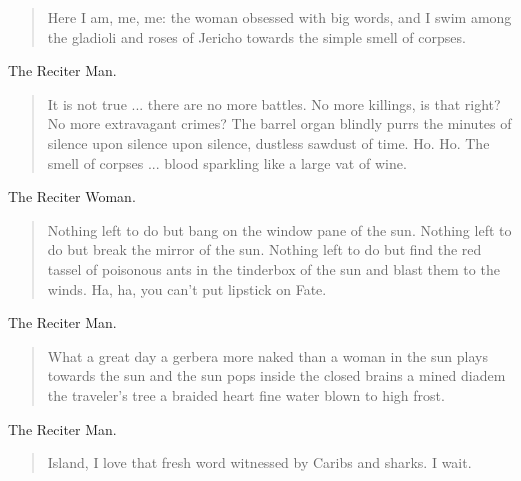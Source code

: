 \documentclass[letterpaper,article,12pt,oneside,notitlepage]{memoir}
\begin{document}
\begin{verse}
Here I am, me, me: the woman obsessed with big words, and I swim among the gladioli and roses of Jericho towards the simple smell of corpses. \\
\end{verse}

\begin{center}The Reciter Man.\end{center}

\begin{verse}
It is not true ... there are no more battles. No more killings, is that right? No more extravagant crimes? The barrel organ blindly purrs the minutes of silence upon silence upon silence, dustless sawdust of time. Ho. Ho. The smell of corpses ... blood sparkling like a large vat of wine. \\
\end{verse}

\begin{center}The Reciter Woman.\end{center}

\begin{verse}
Nothing left to do but bang on the window pane of the sun. Nothing left to do but break the mirror of the sun. Nothing left to do but find the red tassel of poisonous ants in the tinderbox of the sun and blast them to the winds. Ha, ha, you can't put lipstick on Fate. \\
\end{verse}

\clearpage

\begin{center}The Reciter Man.\end{center}

\begin{verse}
What a great day a gerbera more naked than a woman in the sun plays towards the sun and the sun pops inside the closed brains a mined diadem the traveler's tree a braided heart fine water blown to high frost. \\
\end{verse}

\begin{center}The Reciter Man.\end{center}

\begin{verse}
Island, I love that fresh word witnessed by Caribs and sharks. I wait. \\
\end{verse}
\end{document}
